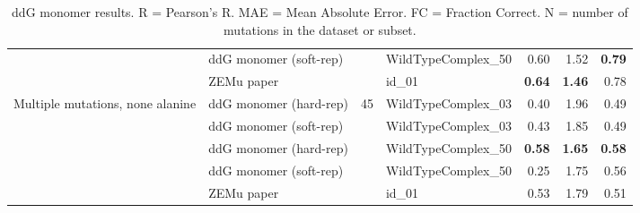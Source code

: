 \begin{table}
\begin{tabular}{llrlrrr}
 & ddG monomer (soft-rep) & & WildTypeComplex\_50 & 0.60 & 1.52 & \textbf{0.79}  \\
 & ZEMu paper & & id\_01 & \textbf{0.64} & \textbf{1.46} & 0.78  \\
\hline
 \multirow{ 5}{*}{Multiple mutations, none alanine} & ddG monomer (hard-rep) & \multirow{ 5}{*}{45} & WildTypeComplex\_03 & 0.40 & 1.96 & 0.49  \\
 & ddG monomer (soft-rep) & & WildTypeComplex\_03 & 0.43 & 1.85 & 0.49  \\
 & ddG monomer (hard-rep) & & WildTypeComplex\_50 & \textbf{0.58} & \textbf{1.65} & \textbf{0.58}  \\
 & ddG monomer (soft-rep) & & WildTypeComplex\_50 & 0.25 & 1.75 & 0.56  \\
 & ZEMu paper & & id\_01 & 0.53 & 1.79 & 0.51  \\
\bottomrule
\end{tabular}
  \caption[ddG monomer results]{
    ddG monomer results. R = Pearson's R. MAE = Mean Absolute Error. FC = Fraction Correct. N = number of mutations in the dataset or subset.
  } \label{tab:table-ddG-monomer}
\end{table}
